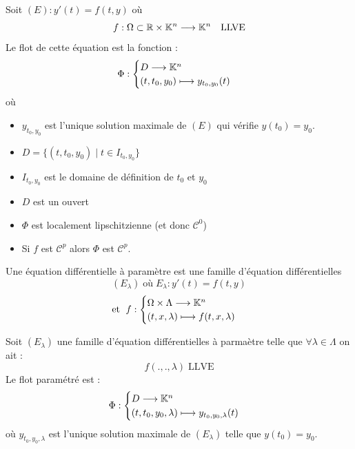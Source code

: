 \begin{definition}[Flot]
    Soit $(E) : y'(t) = f(t,y)$ où 
        \[ f : \Omega \subset \mathbb{R} \times \mathbb{K}^n \longrightarrow \mathbb{K}^n \quad \text{LLVE} \] 
    Le flot de cette équation est la fonction : 
        \[ \Phi : 
            \begin{cases}
                D \longrightarrow \mathbb{K}^n \\ 
                (t,t_0, y_0) \longmapsto y_{t_0, y_0}(t) 
            \end{cases} \] 
    où 
    \begin{itemize}
        \item $y_{t_0, y_0}$ est l'unique solution maximale de $(E)$ qui vérifie $y(t_0) = y_0$. 
        \item $D = \{(t,t_0, y_0) \; | \; t \in I_{t_0, y_0}\} $
        \item $I_{t_0, y_0}$ est le domaine de définition de $t_0$ et $y_0$
    \end{itemize}
\end{definition}

\begin{prop}[Flot]
    \begin{itemize}
        \item $D$ est un ouvert 
        \item $\Phi$ est localement lipschitzienne (et donc $ \mathcal{C}^0$)
        \item Si $f$ est $ \mathcal{C}^p$ alors $\Phi$ est $ \mathcal{C}^p$. 
    \end{itemize}
\end{prop}

\begin{definition}
    Une équation différentielle à paramètre est une famille d'équation différentielles 
        \[ (E_\lambda) \; \text{où} \; E_\lambda : y'(t) = f(t,y) \] 
        \[ \text{et } \;  f : 
            \begin{cases}
                \Omega \times \Lambda \longrightarrow \mathbb{K}^n \\ 
                (t,x,\lambda) \longmapsto f(t,x,\lambda)
            \end{cases} \] 
\end{definition}

\begin{definition}
    Soit $(E_\lambda)$ une famille d'équation différentielles à parmaètre telle que $ \forall \lambda \in \Lambda$ 
    on ait :
        \[ f(.,.,\lambda) \; \text{LLVE} \] 
    Le flot paramétré est : 
        \[ \Phi : 
            \begin{cases}
                D \longrightarrow \mathbb{K}^n \\ 
                (t,t_0,y_0,\lambda) \longmapsto y_{t_0, y_0, \lambda}(t) 
            \end{cases} \] 
    où $y_{t_0, y_0, \lambda}$ est l'unique solution maximale de $(E_\lambda)$ telle que $y(t_0) = y_0$. 
\end{definition}

